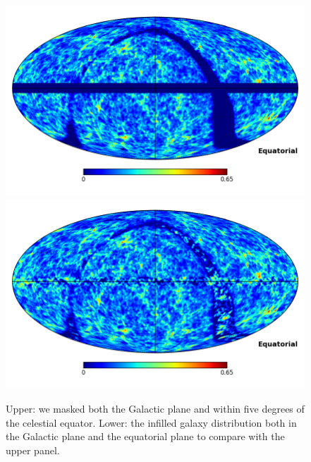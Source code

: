 \documentclass[useAMS,usenatbib]{mn2e}
\begin{document}
\begin{figure}
  \includegraphics[width=\columnwidth]{infill_test_maskeddataC.png}
  \includegraphics[width=\columnwidth]{infill_test_resultC.png}
  \caption{Upper: we masked both the Galactic plane and within
    five degrees of the celestial equator.  Lower: the infilled galaxy
    distribution both in the Galactic plane and the equatorial plane
    to compare with the upper panel.}
  \label{fig:infilling_test}
\end{figure}
\end{document}
